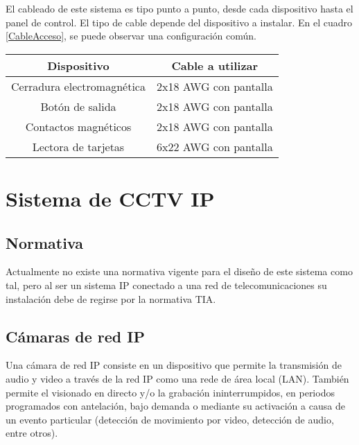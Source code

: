 El cableado de este sistema es tipo punto a punto, desde cada dispositivo hasta el panel de control. El tipo de cable depende del dispositivo a instalar. En el cuadro \ref{CableAcceso}, se puede observar una configuración común. \cite{CIEMI}

\begin{table*}[h]
	\caption{Configuración general de cableado de control de acceso.}
	\label{CableAcceso}
	\begin{center}
		\begin{tabular}{|c|c|}
			\hline 
			\textbf{Dispositivo} & \textbf{Cable a utilizar}\\ 
			\hline 
			Cerradura electromagnética & 2x18 AWG con pantalla \\ 
			\hline 
			Botón de salida & 2x18 AWG con pantalla \\ 
			\hline 
			Contactos magnéticos & 2x18 AWG con pantalla \\ 
			\hline 
			Lectora de tarjetas & 6x22 AWG con pantalla \\ 
			\hline 
		\end{tabular} 
	\end{center}
\end{table*}


\newpage


\section{Sistema de CCTV IP}

\subsection{Normativa}

Actualmente no existe una normativa vigente para el diseño de este sistema como tal, pero al ser un sistema IP conectado a una red de telecomunicaciones su instalación debe de regirse por la normativa TIA.


\subsection{Cámaras de red IP }


Una cámara de red IP consiste en un dispositivo que permite la transmisión de audio y video a través de la red IP como una rede de área local (LAN). También permite el visionado en directo y/o la grabación ininterrumpidos, en periodos programados con antelación, bajo demanda o mediante su activación a causa de un evento particular (detección de movimiento por video, detección de audio, entre otros). \cite{Axis} \\

